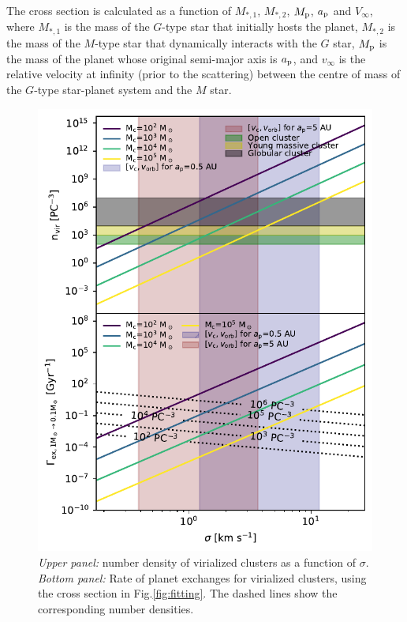 \documentclass[twocolumn]{aastex62}
\begin{document}
The cross section is calculated as a function of $M_{*,1}$, $M_{*,2}$, $M_{\rm p}$, $a_{\rm p}$ and $V_\infty$, where $M_{*,1}$ is the mass of the $G$-type star that initially hosts the planet, $M_{*,2}$ is the mass of the $M$-type star that dynamically interacts with the $G$ star, $M_{\rm p}$ is the mass of the planet whose original semi-major axis is $a_{\rm p}$, and $v_\infty$ is the relative velocity at infinity (prior to the scattering) between the centre of mass of the $G$-type star-planet system and the $M$ star.

\begin{figure}
 \includegraphics[width=1\columnwidth]{letter-rate-dispersion}
  \caption{\color{red}\textit{Upper panel:} number density of virialized clusters as a function of $\sigma$. \textit{Bottom panel:} Rate of planet exchanges for virialized clusters,  using the cross section in Fig.\ref{fig:fitting}. The dashed lines show the corresponding number densities.}
 \label{fig:rate}
\end{figure}
\end{document}
